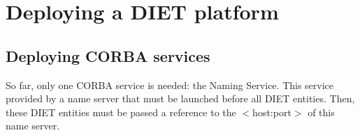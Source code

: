 
\chapter{Deploying a DIET platform}
\label{ch:deploying}


\section{Deploying CORBA services}
\label{sec:CORBA_services}

So far, only one CORBA service is needed: the Naming Service. This
service provided by a name server that must be launched before all
DIET entities. Then, these DIET entities must be passed a reference to
the $<$host:port$>$ of this name server.

